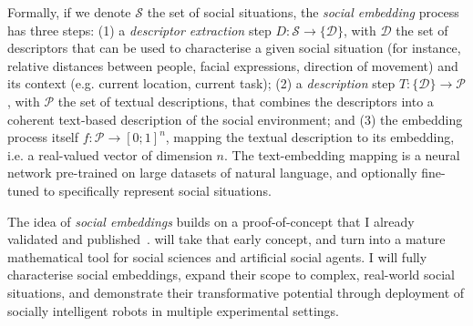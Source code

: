 Formally, if we denote $\mathcal{S}$ the set of social situations, the
\emph{social embedding} process has three steps: (1) a \emph{descriptor
extraction} step $D : \mathcal{S} \to \{\mathcal{D}\}$, with $\mathcal{D}$ the
set of descriptors that can be used to characterise a given social situation
(for instance, relative distances between people, facial expressions, direction
of movement) and its context (e.g. current
location, current task); (2) a \emph{description} step $T: \{\mathcal{D}\}
\to \mathcal{P}$, with $\mathcal{P}$ the set of textual descriptions, that
combines the descriptors into a coherent text-based description of the social
environment; and (3) the embedding process itself $f : \mathcal{P} \to [0;1]^n$,
mapping the textual description to its embedding, i.e. a real-valued vector of
dimension $n$. The text-embedding mapping is a neural network pre-trained on
large datasets of natural language, and optionally fine-tuned to specifically
represent social situations.

The idea of \emph{social embeddings} builds on a proof-of-concept that I already
validated and published~\cite{lemaignan2024social}. \project will take that
early concept, and turn into a mature mathematical tool for social sciences and
artificial social agents. I will fully characterise social embeddings, expand
their scope to complex, real-world social situations, and demonstrate their
transformative potential through deployment of socially intelligent robots in
multiple experimental settings.

%
%

